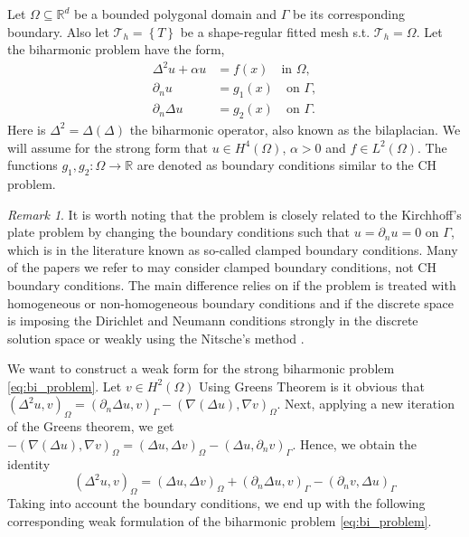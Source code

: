 \documentclass[11pt]{article}
\theoremstyle{remark}
\newtheorem*{remark}{Remark}
\numberwithin{equation}{section}
\begin{document}
Let $\Omega \subseteq    \mathbb{R} ^d$ be a bounded polygonal domain and $\Gamma $ be its corresponding boundary. Also let $\mathcal{T}_{h} = \left\{ T \right\} $ be a shape-regular fitted mesh s.t. $\mathcal{T}_{h} = \Omega $. Let the biharmonic problem have the form,
\begin{subequations}
\begin{align}
    \Delta^2  u  + \alpha  u  & = f( x)  \quad \text{in } \Omega,   \label{eq:bi_problem_a}\\
    \partial _{n} u & = g_{1}(x)   \quad \text{on } \Gamma ,  \label{eq:bi_problem_b}\\
    \partial _{n} \Delta  u & = g_{2}( x)   \quad \text{on } \Gamma .  \label{eq:bi_problem_c}
\end{align}
\label{eq:bi_problem}
\end{subequations}
Here is $\Delta ^2 = \Delta  \left( \Delta  \right) $ the biharmonic operator, also known as the bilaplacian. We will assume for the strong form that $u \in H^{4}\left( \Omega  \right) $, $\alpha  >0 $ and $f \in L^{2}\left( \Omega  \right)
$. The functions $g_{1},g_{2}: \Omega  \to \mathbb{R}$ are denoted as boundary conditions similar to the CH problem.

\begin{remark}
It is worth noting that the problem is closely related to the Kirchhoff's plate problem by changing the boundary conditions such that $u = \partial _{n } u = 0$ on $\Gamma $, which is in the literature known as so-called clamped boundary conditions.
Many of the papers we refer to may consider clamped boundary conditions, not CH boundary conditions.
The main difference relies on if the problem is treated with homogeneous or non-homogeneous boundary conditions and if the discrete space is
imposing the Dirichlet and Neumann conditions strongly in the discrete solution space or weakly using the Nitsche's method \cite{nitsche1971variationsprinzip}.
\end{remark}

We want to construct a weak form for the strong biharmonic problem \eqref{eq:bi_problem}. Let $v \in H^{2}( \Omega ) $  Using Greens Theorem is it obvious that \(
\left( \Delta ^2 u,v \right) _{ \Omega  }   = ( \partial _{n} \Delta u, v ) _{\Gamma   } - ( \nabla \left( \Delta  u \right) , \nabla v ) _{ \Omega }
\).
Next, applying a new iteration of the Greens theorem, we get
$ -( \nabla ( \Delta u ) , \nabla v ) _{\Omega  }  =   ( \Delta u, \Delta v ) _{\Omega } - ( \Delta u, \partial _{n}v )_{\Gamma } $.
Hence, we obtain the identity
\begin{equation}
\label{eq:iden_bi}
( \Delta ^2 u, v ) _{\Omega } = ( \Delta u, \Delta v)_{\Omega } +  ( \partial _{n} \Delta u, v)_{\Gamma } - ( \partial _{n} v, \Delta u) _{\Gamma }
\end{equation}
Taking into account the boundary conditions, we end up with the following corresponding weak formulation of the biharmonic problem \eqref{eq:bi_problem}.
\end{document}
